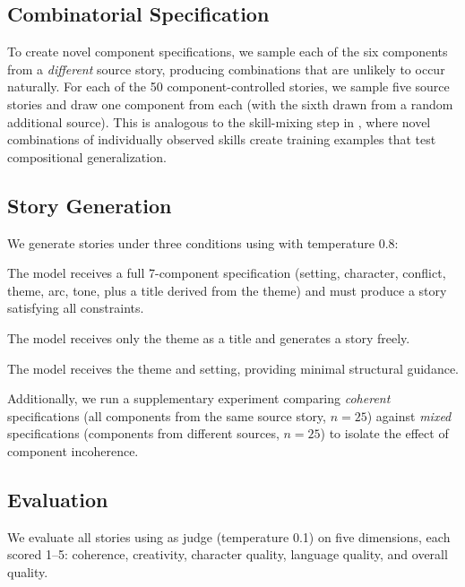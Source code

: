 \subsection{Combinatorial Specification}
\label{sec:combination}

To create novel component specifications, we sample each of the six components from a \emph{different} source story, producing combinations that are unlikely to occur naturally.
For each of the 50 component-controlled stories, we sample five source stories and draw one component from each (with the sixth drawn from a random additional source).
This is analogous to the skill-mixing step in \skillmix, where novel combinations of individually observed skills create training examples that test compositional generalization.

\subsection{Story Generation}
\label{sec:generation}

We generate stories under three conditions using \gptfour with temperature 0.8:

The model receives a full 7-component specification (setting, character, conflict, theme, arc, tone, plus a title derived from the theme) and must produce a story satisfying all constraints.

The model receives only the theme as a title and generates a story freely.

The model receives the theme and setting, providing minimal structural guidance.

Additionally, we run a supplementary experiment comparing \emph{coherent} specifications (all components from the same source story, $n{=}25$) against \emph{mixed} specifications (components from different sources, $n{=}25$) to isolate the effect of component incoherence.

\subsection{Evaluation}
\label{sec:evaluation}

We evaluate all stories using \gptfour as judge (temperature 0.1) on five dimensions, each scored 1--5: coherence, creativity, character quality, language quality, and overall quality.

